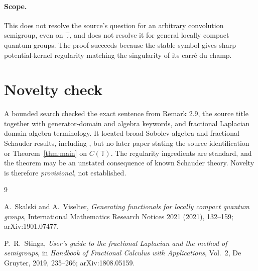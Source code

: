 \documentclass[11pt]{article}
\theoremstyle{remark}
\newcommand{\T}{\mathbb T}
\begin{document}
\paragraph{Scope.}
This does not resolve the source's question for an arbitrary convolution
semigroup, even on $\T$, and does not resolve it for general locally compact
quantum groups. The proof succeeds because the stable symbol gives sharp
potential-kernel regularity matching the singularity of its carr\'e du champ.

\section{Novelty check}

A bounded search checked the exact sentence from Remark 2.9, the source title
together with generator-domain and algebra keywords, and fractional
Laplacian domain-algebra terminology. It located broad Sobolev algebra and
fractional Schauder results, including \cite{Stinga}, but no later paper
stating the source identification or Theorem~\ref{thm:main} on $C(\T)$.
The regularity ingredients are standard, and the theorem may be an unstated
consequence of known Schauder theory. Novelty is therefore \emph{provisional},
not established.

\begin{thebibliography}{9}

A.~Skalski and A.~Viselter,
\emph{Generating functionals for locally compact quantum groups},
International Mathematics Research Notices 2021 (2021), 132--159;
arXiv:1901.07477.

P.~R.~Stinga,
\emph{User's guide to the fractional Laplacian and the method of semigroups},
in \emph{Handbook of Fractional Calculus with Applications}, Vol.~2,
De Gruyter, 2019, 235--266; arXiv:1808.05159.

\end{thebibliography}
\end{document}
